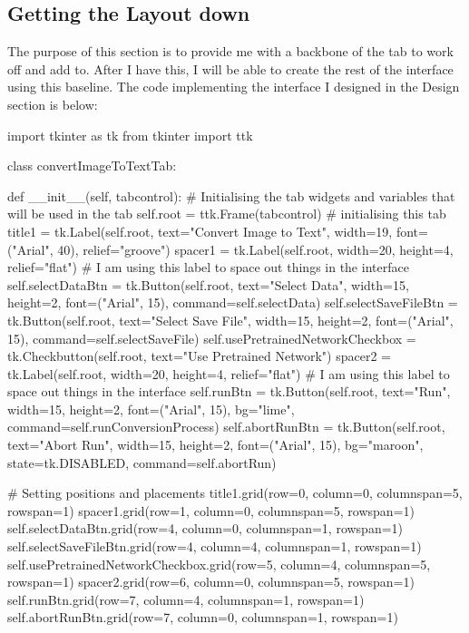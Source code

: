 \documentclass{report}
\begin{document}
\subsection{Getting the Layout down}
The purpose of this section is to provide me with a backbone of the tab to work off and add to. After I have this, I will be able to create the rest of the interface using this baseline. The code implementing the interface I designed in the Design section is below:
\begin{python}
import tkinter as tk
from tkinter import ttk

class convertImageToTextTab:

    def __init__(self, tabcontrol):
        # Initialising the tab widgets and variables that will be used in the tab
        self.root = ttk.Frame(tabcontrol)  # initialising this tab
        title1 = tk.Label(self.root, text="Convert Image to Text", width=19,
				font=("Arial", 40), relief="groove")
        spacer1 = tk.Label(self.root, width=20, height=4, relief="flat")  # I am using this label to space out things in the interface
        self.selectDataBtn = tk.Button(self.root, text="Select Data",
					width=15, height=2, font=("Arial", 15),
					command=self.selectData)
        self.selectSaveFileBtn = tk.Button(self.root, text="Select Save File",
					width=15, height=2, font=("Arial", 15),
					command=self.selectSaveFile)
        self.usePretrainedNetworkCheckbox = tk.Checkbutton(self.root,
						text="Use Pretrained Network")
        spacer2 = tk.Label(self.root, width=20, height=4, relief="flat")  # I am using this label to space out things in the interface
        self.runBtn = tk.Button(self.root, text="Run", width=15, height=2,
				font=("Arial", 15), bg="lime",
				command=self.runConversionProcess)
        self.abortRunBtn = tk.Button(self.root, text="Abort Run", width=15,
				height=2, font=("Arial", 15), bg="maroon",
				state=tk.DISABLED, command=self.abortRun)

        # Setting positions and placements
        title1.grid(row=0, column=0, columnspan=5, rowspan=1)
        spacer1.grid(row=1, column=0, columnspan=5, rowspan=1)
        self.selectDataBtn.grid(row=4, column=0, columnspan=1, rowspan=1)
        self.selectSaveFileBtn.grid(row=4, column=4, columnspan=1, rowspan=1)
        self.usePretrainedNetworkCheckbox.grid(row=5, column=4, columnspan=5,
						rowspan=1)
        spacer2.grid(row=6, column=0, columnspan=5, rowspan=1)
        self.runBtn.grid(row=7, column=4, columnspan=1, rowspan=1)
        self.abortRunBtn.grid(row=7, column=0, columnspan=1, rowspan=1)


\end{python}
\end{document}

